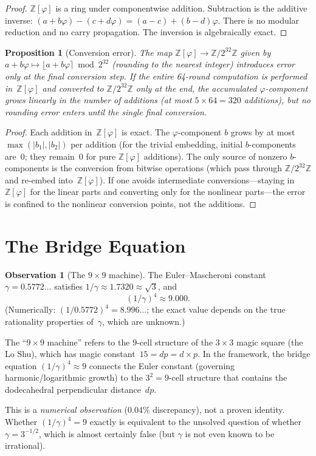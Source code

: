 \documentclass[12pt, a4paper]{article}
\theoremstyle{plain}
\newtheorem{proposition}[theorem]{Proposition}
\theoremstyle{definition}
\newtheorem{observation}[theorem]{Observation}
\newcommand{\Z}{\mathbb{Z}}
\newcommand{\vp}{\varphi}
\newcommand{\Zphi}{\Z[\vp]}
\begin{document}
\begin{proof}
$\Zphi$ is a ring under componentwise addition.
Subtraction is the additive inverse: $(a+b\vp)-(c+d\vp)=(a-c)+(b-d)\vp$.
There is no modular reduction and no carry propagation.
The inversion is algebraically exact.
\end{proof}

\begin{proposition}[Conversion error]\label{prop:conversion-error}
The map $\Zphi\to\Z/2^{32}\Z$ given by
$a+b\vp\mapsto\lfloor a+b\vp\rceil\bmod 2^{32}$ (rounding to
the nearest integer) introduces error only at the final
conversion step.
If the entire 64-round computation is performed in~$\Zphi$
and converted to $\Z/2^{32}\Z$ only at the end, the accumulated
$\vp$-component grows linearly in the number of additions
(at most $5\times 64=320$ additions), but no rounding error
enters until the single final conversion.
\end{proposition}

\begin{proof}
Each addition in~$\Zphi$ is exact.
The $\vp$-component $b$ grows by at most $\max(|b_{1}|,|b_{2}|)$
per addition (for the trivial embedding, initial
$b$-components are~$0$; they remain~$0$ for pure $\Zphi$
additions).
The only source of nonzero $b$-components is the conversion
from bitwise operations (which pass through $\Z/2^{32}\Z$
and re-embed into~$\Zphi$).
If one avoids intermediate conversions---staying in $\Zphi$
for the linear parts and converting only for the nonlinear
parts---the error is confined to the nonlinear conversion
points, not the additions.
\end{proof}

\section{The Bridge Equation}\label{sec:bridge}

\begin{observation}[The $9\times 9$ machine]\label{obs:bridge}
The Euler--Mascheroni constant $\gamma=0.5772\ldots$ satisfies
$1/\gamma\approx 1.7320\approx\sqrt{3}$, and
\[
  (1/\gamma)^{4} \approx 9.000.
\]
(Numerically: $(1/0.5772)^{4}=8.996\ldots$; the exact value
depends on the true rationality properties of~$\gamma$, which are
unknown.)

The ``$9\times 9$ machine'' refers to the $9$-cell structure of
the $3\times 3$ magic square (the Lo Shu), which has magic
constant~$15=dp=d\times p$.
In the framework, the bridge equation
$(1/\gamma)^{4}\approx 9$ connects the Euler constant
(governing harmonic/logarithmic growth) to the $3^{2}=9$-cell
structure that contains the dodecahedral perpendicular
distance~$dp$.

This is a \emph{numerical observation} ($0.04\%$ discrepancy),
not a proven identity.
Whether $(1/\gamma)^{4}=9$ exactly is equivalent to the
unsolved question of whether $\gamma=3^{-1/2}$, which is
almost certainly false (but $\gamma$ is not even known to be
irrational).
\end{observation}
\end{document}
